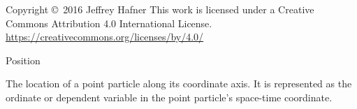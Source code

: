\documentclass[avery5371,grid]{flashcards}
\begin{document}


\begin{flashcard}{Copyright \copyright \, 2016 Jeffrey Hafner}
\vspace{\fill}
This work is licensed under a Creative Commons Attribution 4.0 International License.
\vspace{\fill}
\flushright
\small\url{https://creativecommons.org/licenses/by/4.0/}
\end{flashcard}


\begin{flashcard}[Definition]{Position}
\begin{minipage}{0.6\linewidth}
    The location of a point particle along its coordinate axis.
    It is represented as the ordinate or dependent variable in the point particle's space-time coordinate.

    \vspace{\baselineskip}
\end{minipage}
\begin{minipage}{0.35\linewidth}
    \begin{center}
    \end{center}
\end{minipage}
\end{flashcard}
\end{document}

